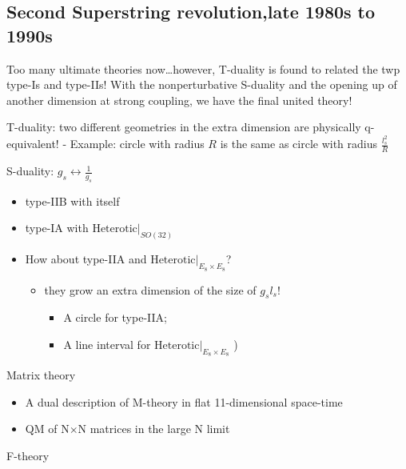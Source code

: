 \documentclass[
]{book}
\providecommand{\tightlist}{%
  \setlength{\itemsep}{0pt}\setlength{\parskip}{0pt}}
\begin{document}
\hypertarget{second-superstring-revolutionlate-1980s-to-1990s}{%
\subsection{Second Superstring revolution,late 1980s to 1990s}\label{second-superstring-revolutionlate-1980s-to-1990s}}

Too many ultimate theories now\ldots however, T-duality is found to related the twp type-Is and type-IIs! With the nonperturbative S-duality and the opening up of another dimension at strong coupling, we have the final united theory!

T-duality: two different geometries in the extra dimension are physically q-equivalent!
- Example: circle with radius \(R\) is the same as circle with radius \(\frac{l^2_s}{R}\)

S-duality: \(g_s \leftrightarrow \frac{1}{g_s}\)

\begin{itemize}
\tightlist
\item
  type-IIB with itself
\item
  type-IA with \(\text{Heterotic}|_{SO(32)}\)
\item
  How about type-IIA and \(\text{Heterotic}|_{E_8 \times E_8}\)?

  \begin{itemize}
  \tightlist
  \item
    they grow an extra dimension of the size of \(g_s l_s\)!

    \begin{itemize}
    \tightlist
    \item
      A circle for type-IIA;
    \item
      A line interval for \(\text{Heterotic}|_{E_8 \times E_8}\) )
    \end{itemize}
  \end{itemize}
\end{itemize}

Matrix theory

\begin{itemize}
\tightlist
\item
  A dual description of M-theory in flat 11-dimensional space-time
\item
  QM of N\(\times\)N matrices in the large N limit
\end{itemize}

F-theory
\end{document}
